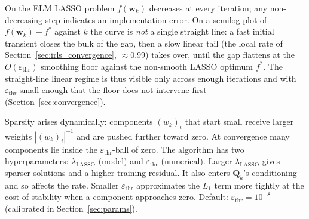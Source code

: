 On the ELM LASSO problem $f(\mathbf{w}_k)$ decreases at every iteration; any non-decreasing step indicates an implementation error. On a semilog plot of $f(\mathbf{w}_k) - f^*$ against $k$ the curve is \emph{not} a single straight line: a fast initial transient closes the bulk of the gap, then a slow linear tail (the local rate of Section~\ref{sec:irls_convergence}, $\approx 0.99$) takes over, until the gap flattens at the $O(\varepsilon_{\mathrm{thr}})$ smoothing floor against the non-smooth LASSO optimum $f^*$. The straight-line linear regime is thus visible only across enough iterations and with $\varepsilon_{\mathrm{thr}}$ small enough that the floor does not intervene first (Section~\ref{sec:convergence}).

Sparsity arises dynamically: components $(w_k)_i$ that start small receive larger weights $|(w_k)_i|^{-1}$ and are pushed further toward zero. At convergence many components lie inside the $\varepsilon_{\mathrm{thr}}$-ball of zero. The algorithm has two hyperparameters: $\lambda_{\text{LASSO}}$ (model) and $\varepsilon_{\mathrm{thr}}$ (numerical). Larger $\lambda_{\text{LASSO}}$ gives sparser solutions and a higher training residual. It also enters $\mathbf{Q}_k$'s conditioning and so affects the rate. Smaller $\varepsilon_{\mathrm{thr}}$ approximates the $L_1$ term more tightly at the cost of stability when a component approaches zero. Default: $\varepsilon_{\mathrm{thr}} = 10^{-8}$ (calibrated in Section~\ref{sec:params}).
